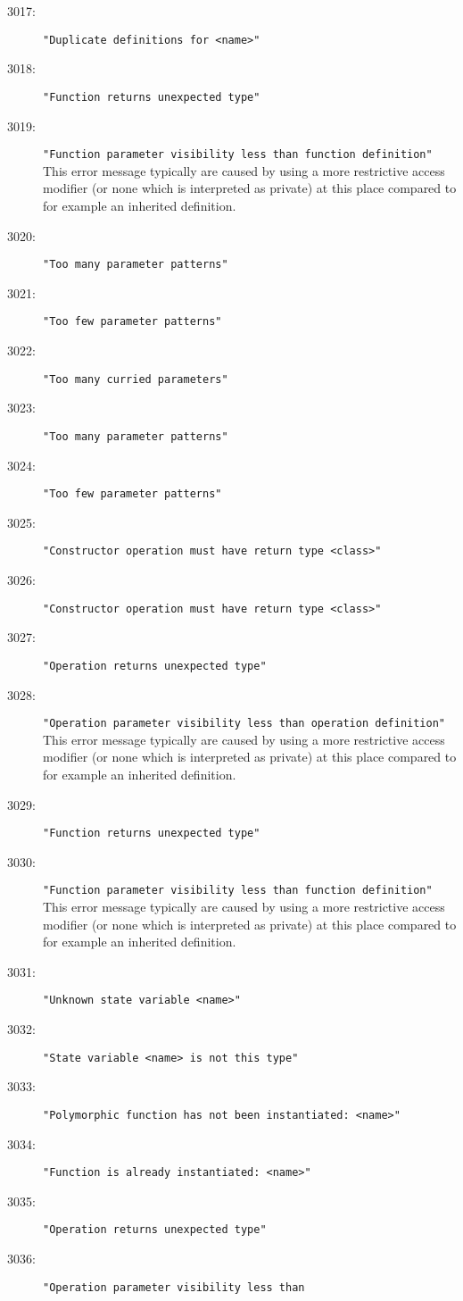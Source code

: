 \begin{description}
\item[3017:] \texttt{"Duplicate definitions for <name>"}
\item[3018:] \texttt{"Function returns unexpected type"}
\item[3019:] \texttt{"Function parameter visibility less than function
  definition"} This
  error message typically are caused by using a more restrictive
  access modifier (or none which is interpreted as private) at this
  place compared to for example an inherited definition.
\item[3020:] \texttt{"Too many parameter patterns"}
\item[3021:] \texttt{"Too few parameter patterns"}
\item[3022:] \texttt{"Too many curried parameters"}
\item[3023:] \texttt{"Too many parameter patterns"}
\item[3024:] \texttt{"Too few parameter patterns"}
\item[3025:] \texttt{"Constructor operation must have return type <class>"}
\item[3026:] \texttt{"Constructor operation must have return type <class>"}
\item[3027:] \texttt{"Operation returns unexpected type"}
\item[3028:] \texttt{"Operation parameter visibility less than
  operation definition"} This
  error message typically are caused by using a more restrictive
  access modifier (or none which is interpreted as private) at this
  place compared to for example an inherited definition.
\item[3029:] \texttt{"Function returns unexpected type"}
\item[3030:] \texttt{"Function parameter visibility less than function
  definition"} This
  error message typically are caused by using a more restrictive
  access modifier (or none which is interpreted as private) at this
  place compared to for example an inherited definition.
\item[3031:] \texttt{"Unknown state variable <name>"}
\item[3032:] \texttt{"State variable <name> is not this type"}
\item[3033:] \texttt{"Polymorphic function has not been instantiated: <name>"}
\item[3034:] \texttt{"Function is already instantiated: <name>"}
\item[3035:] \texttt{"Operation returns unexpected type"}
\item[3036:] \texttt{"Operation parameter visibility less than
}
\end{description}
